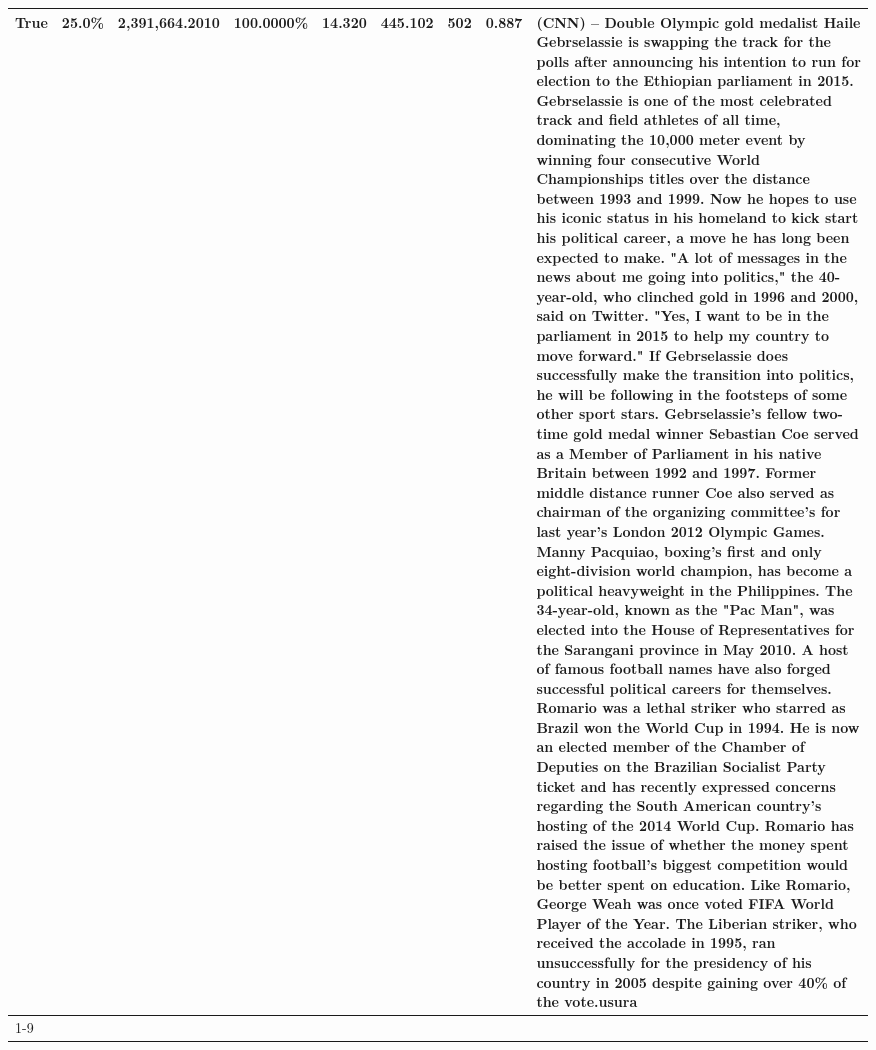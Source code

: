 \begin{table}[H]
{\begin{tabular}{lllrlllll}
True & 25.0\% & 2,391,664.2010 & \bfseries \color{red} 100.0000\% & 14.320 & 445.102 & 502 & 0.887 & (CNN) -- Double Olympic gold medalist Haile Gebrselassie is swapping the track for the polls after announcing his intention to run for election to the Ethiopian parliament in 2015. Gebrselassie is one of the most celebrated track and field athletes of all time, dominating the 10,000 meter event by winning four consecutive World Championships titles over the distance between 1993 and 1999. Now he hopes to use his iconic status in his homeland to kick start his political career, a move he has long been expected to make. "A lot of messages in the news about me going into politics," the 40-year-old, who clinched gold in 1996 and 2000, said on Twitter. "Yes, I want to be in the parliament in 2015 to help my country to move forward." If Gebrselassie does successfully make the transition into politics, he will be following in the footsteps of some other sport stars. Gebrselassie's fellow two-time gold medal winner Sebastian Coe served as a Member of Parliament in his native Britain between 1992 and 1997. Former middle distance runner Coe also served as chairman of the organizing committee's for last year's London 2012 Olympic Games. Manny Pacquiao, boxing's first and only eight-division world champion, has become a political heavyweight in the Philippines. The 34-year-old, known as the "Pac Man", was elected into the House of Representatives for the Sarangani province in May 2010. A host of famous football names have also forged successful political careers for themselves. Romario was a lethal striker who starred as Brazil won the World Cup in 1994. He is now an elected member of the Chamber of Deputies on the Brazilian Socialist Party ticket and has recently expressed concerns regarding the South American country's hosting of the 2014 World Cup. Romario has raised the issue of whether the money spent hosting football's biggest competition would be better spent on education. Like Romario, George Weah was once voted FIFA World Player of the Year. The Liberian striker, who received the accolade in 1995, ran unsuccessfully for the presidency of his country in 2005 despite gaining over 40\% of the vote.usura \\
\cline{1-9}

\end{tabular}}
\end{table}
